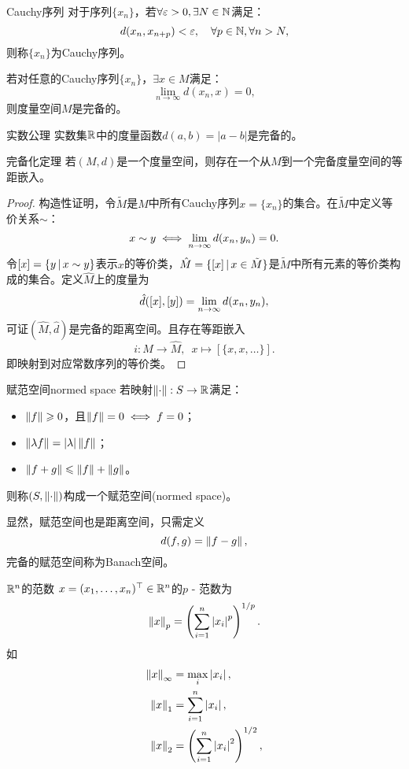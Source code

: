 \begin{definition}
    {Cauchy序列}{}
    对于序列$\{x_n\}$，若$\forall\varepsilon>0,\exists N\in\mathbb N$满足：
    \begin{equation}
        d(x_n,x_{n+p})<\varepsilon,\quad\forall p\in\mathbb N,\forall n>N,
    \end{equation}
    则称$\{x_n\}$为Cauchy序列。
\end{definition}

若对任意的Cauchy序列$\{x_n\}$，$\exists x\in M$满足：
\[
    \lim_{n\to\infty}d(x_n,x)=0,
\]
则度量空间$M$是完备的。

\begin{example}
    {实数公理}{}
    实数集$\mathbb R$中的度量函数$d(a,b)=|a-b|$是完备的。
\end{example}

\begin{theorem}
    {完备化定理}{}
    若$(M,d)$是一个度量空间，则存在一个从$M$到一个完备度量空间的等距嵌入。
\end{theorem}

\begin{proof}
    构造性证明，令$\tilde M$是$M$中所有Cauchy序列$x=\{x_n\}$的集合。在$\tilde M$中定义等价关系$\sim$：
    \[
        x\sim y\iff\lim_{n{\to\infty}}d(x_n,y_n)=0.
    \]
    令$[x]=\{y\,|\,x\sim y\}$表示$x$的等价类，$\hat M=\{[x]\,|\,x\in\tilde M\}$是$\tilde M$中所有元素的等价类构成的集合。定义$\hat M$上的度量为
    \[
        \hat d([x],[y])=\lim_{n{\to\infty}}d(x_n,y_n),
    \]
    可证$(\hat M,\hat d)$是完备的距离空间。且存在等距嵌入
    \[
        i:M\to\hat M,\enspace x\mapsto[\{x,x,\ldots\}].
    \]
    即映射到对应常数序列的等价类。
\end{proof}

\begin{definition}
    {赋范空间}{normed space}
    若映射$\left\lVert\cdot\right\rVert:S\to\mathbb R$满足：
    \begin{itemize}
        \item $\left\lVert f\right\rVert\geqslant 0$，且$\left\lVert f\right\rVert=0\iff f=0$；
        \item $\left\lVert\lambda f\right\rVert=\left\lvert\lambda\right\rvert\left\lVert f\right\rVert$；
        \item $\left\lVert f+g\right\rVert\leqslant\left\lVert f\right\rVert+\left\lVert g\right\rVert$。
    \end{itemize}
    则称$(S,\left\lVert\cdot\right\rVert)$构成一个赋范空间(normed space)。
\end{definition}

显然，赋范空间也是距离空间，只需定义
\[
    d(f,g)=\left\lVert f-g\right\rVert,
\]
完备的赋范空间称为Banach空间。

\begin{example}
    {$\mathbb R^n$的范数}{}
    $x=(x_1,\ldots,x_n)^\top\in\mathbb R^n$的$p$ - 范数为
    \[
        \left\lVert x\right\rVert_p=\left(\sum_{i=1}^n\left\lvert x_i\right\rvert^p\right)^{1/p}.
    \]
    如
    \begin{subequations}
        \begin{align}
            \left\lVert x\right\rVert_\infty&=\max_{i}\left\lvert x_i\right\rvert,\\
            \left\lVert x\right\rVert_1&=\sum_{i=1}^n\left\lvert x_i\right\rvert,\\
            \left\lVert x\right\rVert_2&=\left(\sum_{i=1}^n\left\lvert x_i\right\rvert^2\right)^{1/2},
        \end{align}
    \end{subequations}
\end{example}

